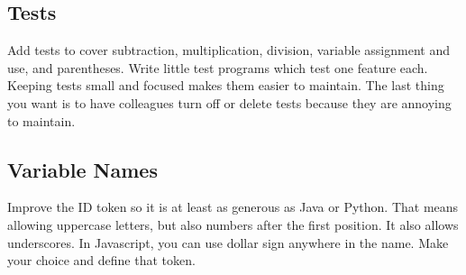 \subsection{Tests}

Add tests to cover subtraction, multiplication, division, variable
assignment and use, and parentheses. Write little test programs
which test one feature each. Keeping tests small and focused makes
them easier to maintain. The last thing you want is to have colleagues
turn off or delete tests because they are annoying to maintain.

\subsection{Variable Names}

Improve the ID token so it is at least as generous as Java or Python.
That means allowing uppercase letters, but also numbers after the first
position. It also allows underscores. In Javascript, you can use dollar
sign anywhere in the name. Make your choice and define that token.
